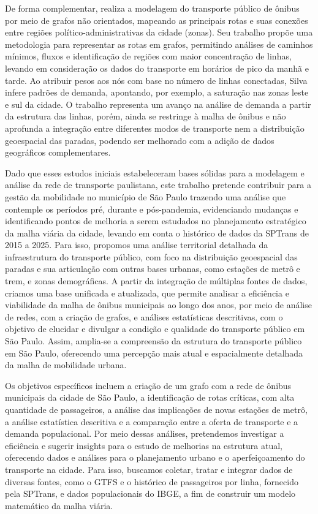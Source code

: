 De forma complementar, \citet{tcc:Danilo} realiza a modelagem do transporte público de ônibus por meio de grafos não orientados, mapeando as principais rotas e suas conexões entre regiões político-administrativas da cidade (zonas). Seu trabalho propõe uma metodologia para representar as rotas em grafos, permitindo análises de caminhos mínimos, fluxos e identificação de regiões com maior concentração de linhas, levando em consideração os dados do transporte em horários de pico da manhã e tarde. Ao atribuir pesos aos nós com base no número de linhas conectadas, Silva infere padrões de demanda, apontando, por exemplo, a saturação nas zonas leste e sul da cidade. O trabalho representa um avanço na análise de demanda a partir da estrutura das linhas, porém, ainda se restringe à malha de ônibus e não aprofunda a integração entre diferentes modos de transporte nem a distribuição geoespacial das paradas, podendo ser melhorado com a adição de dados geográficos complementares.

Dado que esses estudos iniciais estabeleceram bases sólidas para a modelagem e análise da rede de transporte paulistana, este trabalho pretende contribuir para a gestão da mobilidade no município de São Paulo trazendo uma análise que contemple os períodos pré, durante e pós-pandemia, evidenciando mudanças e identificando pontos de melhoria a serem estudados no planejamento estratégico da malha viária da cidade, levando em conta o histórico de dados da SPTrans de 2015 a 2025. Para isso, propomos uma análise territorial detalhada da infraestrutura do transporte público, com foco na distribuição geoespacial das paradas e sua articulação com outras bases urbanas, como estações de metrô e trem, e zonas demográficas. A partir da integração de múltiplas fontes de dados, criamos uma base unificada e atualizada, que permite analisar a eficiência e viabilidade da malha de ônibus municipais ao longo dos anos, por meio de análise de redes, com a criação de grafos, e análises estatísticas descritivas, com o objetivo de elucidar e divulgar a condição e qualidade do transporte público em São Paulo. Assim, amplia-se a compreensão da estrutura do transporte público em São Paulo, oferecendo uma percepção mais atual e espacialmente detalhada da malha de mobilidade urbana.

Os objetivos específicos incluem a criação de um grafo com a rede de ônibus municipais da cidade de São Paulo, a identificação de rotas críticas, com alta quantidade de passageiros, a análise das implicações de novas estações de metrô, a análise estatística descritiva e a comparação entre a oferta de transporte e a demanda populacional. Por meio dessas análises, pretendemos investigar a eficiência e sugerir insights para o estudo de melhorias na estrutura atual, oferecendo dados e análises para o planejamento urbano e o aperfeiçoamento do transporte na cidade. Para isso, buscamos coletar, tratar e integrar dados de diversas fontes, como o GTFS e o histórico de passageiros por linha, fornecido pela SPTrans, e dados populacionais do IBGE, a fim de construir um modelo matemático da malha viária.

